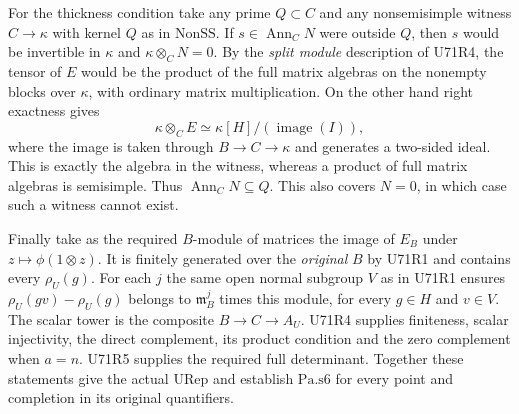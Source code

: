 For the thickness condition take any prime $Q\subset C$ and any
nonsemisimple witness $C\to\kappa$ with kernel $Q$ as in
$\mathrm{NonSS}$. If $s\in\operatorname{Ann}_C N$ were outside
$Q$, then $s$ would be invertible in $\kappa$ and
$\kappa\otimes_C N=0$. By the \emph{split module} description of
U71R4, the tensor of $E$ would be the product of the full matrix
algebras on the nonempty blocks over $\kappa$, with ordinary
matrix multiplication. On the other hand right exactness gives
\[
 \kappa\otimes_C E
 \simeq \kappa[H]/(\operatorname{image}(I)),
\]
where the image is taken through $B\to C\to\kappa$ and generates a
two-sided ideal. This is exactly the algebra in the witness, whereas
a product of full matrix algebras is semisimple. Thus
$\operatorname{Ann}_C N\subseteq Q$. This also covers $N=0$,
in which case such a witness cannot exist.

Finally take as the required $B$-module of matrices the image
of $E_B$ under $z\mapsto\phi(1\otimes z)$. It is finitely generated
over the \emph{original} $B$ by U71R1 and contains every $\rho_U(g)$.
For each $j$ the same open normal subgroup $V$ as in U71R1 ensures
$\rho_U(gv)-\rho_U(g)$ belongs to $\mathfrak m_B^j$ times this
module, for every $g\in H$ and $v\in V$.
The scalar tower is the composite $B\to C\to A_U$. U71R4 supplies
finiteness, scalar injectivity, the direct complement, its product
condition and the zero complement when $a=n$. U71R5 supplies the
required full determinant. Together these statements give the actual
$\mathrm{URep}$ and establish $\mathrm{Pa.s6}$ for every point and
completion in its original quantifiers.
